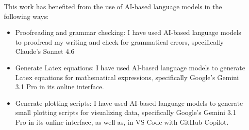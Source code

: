 This work has benefited from the use of AI-based language models in the following ways:
\begin{itemize}
    \item Proofreading and grammar checking: I have used AI-based language models to proofread my writing and check for grammatical errors, specifically Claude's Sonnet 4.6 
    \item Generate Latex equations: I have used AI-based language models to generate Latex equations for mathematical expressions, specifically Google's Gemini 3.1 Pro in its online interface.
    \item Generate plotting scripts: I have used AI-based language models to generate small plotting scripts for visualizing data, specifically Google's Gemini 3.1 Pro in its online interface, as well as, in VS Code with GitHub Copilot.
\end{itemize}